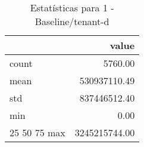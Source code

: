 \begin{table}[htbp]
\caption{Estatísticas para 1 - Baseline/tenant-d}
\label{tab:1_-_baseline_tenant-d_summary}
\begin{tabular}{lr}
\toprule
 & value \\
\midrule
count & 5760.00 \\
mean & 530937110.49 \\
std & 837446512.40 \\
min & 0.00 \\
25%
50%
75%
max & 3245215744.00 \\
\bottomrule
\end{tabular}
\end{table}

